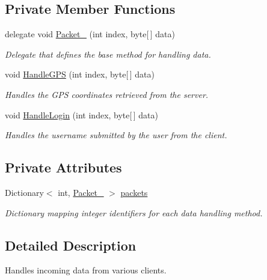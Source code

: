 \subsection*{Private Member Functions}
\begin{DoxyCompactItemize}
\item 
delegate void \mbox{\hyperlink{class_server_handle_data_ae901e6592461e1e8403b0161e4a6c6a6}{Packet\+\_\+}} (int index, byte\mbox{[}$\,$\mbox{]} data)
\begin{DoxyCompactList}\small\item\em Delegate that defines the base method for handling data. \end{DoxyCompactList}\item 
void \mbox{\hyperlink{class_server_handle_data_a2abdef3f8569c15c1bccae82bd04457e}{Handle\+G\+PS}} (int index, byte\mbox{[}$\,$\mbox{]} data)
\begin{DoxyCompactList}\small\item\em Handles the G\+PS coordinates retrieved from the server. \end{DoxyCompactList}\item 
void \mbox{\hyperlink{class_server_handle_data_a4c8dd95c63e24e150f4d80b89c0b8188}{Handle\+Login}} (int index, byte\mbox{[}$\,$\mbox{]} data)
\begin{DoxyCompactList}\small\item\em Handles the username submitted by the user from the client. \end{DoxyCompactList}\end{DoxyCompactItemize}
\subsection*{Private Attributes}
\begin{DoxyCompactItemize}
\item 
Dictionary$<$ int, \mbox{\hyperlink{class_server_handle_data_ae901e6592461e1e8403b0161e4a6c6a6}{Packet\+\_\+}} $>$ \mbox{\hyperlink{class_server_handle_data_a072f1064e1d192b4001b1aaf2bfc3059}{packets}}
\begin{DoxyCompactList}\small\item\em Dictionary mapping integer identifiers for each data handling method. \end{DoxyCompactList}\end{DoxyCompactItemize}


\subsection{Detailed Description}
Handles incoming data from various clients. 



